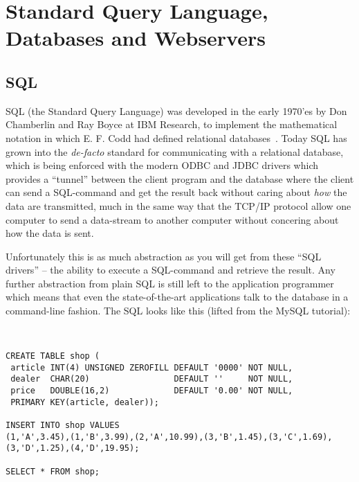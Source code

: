 
\chapter{Standard Query Language, Databases and Webservers}


\section{SQL}

SQL (the Standard Query Language) was developed in the early 1970'es
by Don Chamberlin and Ray Boyce at IBM Research, to implement the
mathematical notation in which E. F. Codd had defined relational
databases~\cite{a-relational-model-of-data-for-large-shared-databanks}.
Today SQL has grown into the \textit{de-facto} standard for
communicating with a relational database, which is being enforced with
the modern ODBC and JDBC drivers which provides a ``tunnel'' between
the client program and the database where the client can send a
SQL-command and get the result back without caring about \textit{how}
the data are transmitted, much in the same way that the TCP/IP
protocol allow one computer to send a data-stream to another computer
without concering about how the data is sent.

Unfortunately this is as much abstraction as you will get from these
``SQL drivers'' -- the ability to execute a SQL-command and retrieve
the result.  Any further abstraction from plain SQL is still left to
the application programmer which means that even the state-of-the-art
applications talk to the database in a command-line fashion.   The SQL
looks like this (lifted from the MySQL tutorial):

\begin{verbatim}


CREATE TABLE shop (
 article INT(4) UNSIGNED ZEROFILL DEFAULT '0000' NOT NULL,
 dealer  CHAR(20)                 DEFAULT ''     NOT NULL,
 price   DOUBLE(16,2)             DEFAULT '0.00' NOT NULL,
 PRIMARY KEY(article, dealer));

INSERT INTO shop VALUES
(1,'A',3.45),(1,'B',3.99),(2,'A',10.99),(3,'B',1.45),(3,'C',1.69),
(3,'D',1.25),(4,'D',19.95);

SELECT * FROM shop;

\end{verbatim}

